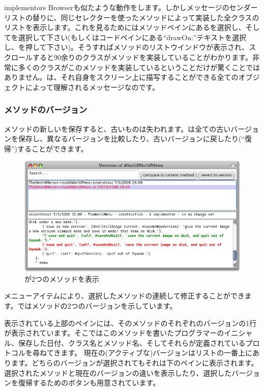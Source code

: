 \documentclass[a4paper,10pt,twoside]{book}
\begin{document}
implementors Browserも似たような動作をします。しかしメッセージのセンダーリストの替りに、同じセレクターを使ったメソッドによって実装した全クラスのリストを表示します。これを見るためにはメソッドペインにあるを選択し、そしてを選択して下さい(もしくはコードペインにある``drawOn:''テキストを選択し、を押して下さい)。そうすればメソッドのリストウインドウが表示され、スクロールすると90余りのクラスがメソッドを実装していることがわかります。非常に多くのクラスがこのメソッドを実装しているということだけが驚くことではありません。は、それ自身をスクリーン上に描写することができる全てのオブジェクトによって理解されるメッセージなのです。
\subsubsection{メソッドのバージョン}

メソッドの新しいを保存すると、古いものは失われます。\pharo は全ての古いバージョンを保存し、異なるバージョンを比較したり、古いバージョンに戻したり(``復帰'')することができます。
\begin{figure}[btp]
   \centering
   \includegraphics[width=\textwidth]{Versions}
   \caption{が2つのメソッドを表示}
\end{figure}
メニューアイテムにより、選択したメソッドの連続して修正することができます。ではメソッドの2つのバージョンを示しています。

表示されている上部のペインには、そのメソッドのそれぞれのバージョンの1行が表示されています。そこではこのメソッドを書いたプログラマーのイニシャル、保存した日付、クラス名とメソッド名、そしてそれらが定義されているプロトコルを尋ねてきます。
現在の(アクティブな)バージョンはリストの一番上にあります。どちらのバージョンが選択されてもそれは下のペインに表示されます。
選択されたメソッドと現在のバージョンの違いを表示したり、選択したバージョンを復帰するためのボタンも用意されています。
\end{document}
